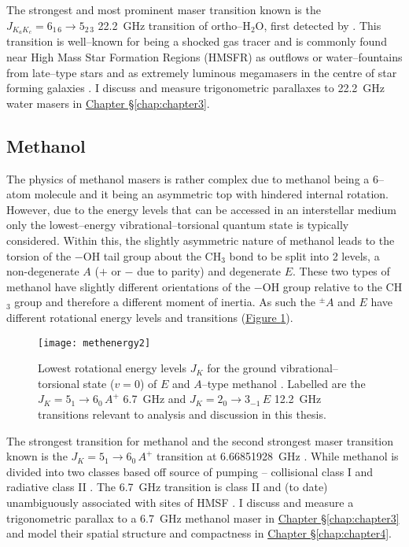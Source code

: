 			The strongest and most prominent maser transition known is the $J_{K_a K_c}=6_{1\,6}\rightarrow5_{2\,3}$ 22.2~GHz transition of ortho--H$_2$O, first detected by \citet{Cheung1969}. This transition is well--known for being a shocked gas tracer and is commonly found near High Mass Star Formation Regions (HMSFR) as outflows or water--fountains from late--type stars \citep[e.g. ][]{Orosz2019} and as extremely luminous megamasers in the centre of star forming galaxies \citep{DosSantosLepine1979}. I discuss and measure trigonometric parallaxes to 22.2~GHz water masers in \hyperref[chap:chapter3]{Chapter \S \ref*{chap:chapter3}}.
			
		\subsection{Methanol}
			The physics of methanol masers is rather complex due to methanol being a 6--atom molecule and it being an asymmetric top with hindered internal rotation. However, due to the energy levels that can be accessed in an interstellar medium only the lowest--energy vibrational--torsional quantum state is typically considered. Within this, the slightly asymmetric nature of methanol leads to the torsion of the $-$OH tail group about the CH$_3$ bond to be split into 2 levels, a non-degenerate $A$ ($+$ or $-$ due to parity) and degenerate $E$. These two types of methanol have slightly different orientations of the $-$OH group relative to the CH$_3$ group and therefore a different moment of inertia. As such the $^\pm A$ and $E$ have different rotational energy levels and transitions (\hyperref[fig:intro_methanollevels]{Figure \ref*{fig:intro_methanollevels}}).
			\begin{figure}
				\centering
				\texttt{[image: methenergy2]}
				\caption[Methanol energy levels]{Lowest rotational energy levels $J_K$ for the ground vibrational--torsional state ($v=0$) of $E$ and $A$--type methanol \citet{Jansen2011}. Labelled are the $J_K=5_1\rightarrow6_0\,A^+$ 6.7~GHz and $J_K=2_0\rightarrow3_{-1}\,E$ 12.2~GHz transitions relevant to analysis and discussion in this thesis.}
				\label{fig:intro_methanollevels}
			\end{figure}
			
			The strongest transition for methanol and the second strongest maser transition known is the $J_K=5_1\rightarrow6_0\,A^+$ transition at 6.66851928~GHz \citep{Menten1991}. While methanol is divided into two classes based off source of pumping -- collisional class I and radiative class II \citep[][]{Menten1991b}. The 6.7~GHz transition is class II and (to date) unambiguously associated with sites of HMSF \citep[][]{Ellingsen2006,Breen2013}. I discuss and measure a trigonometric parallax to a 6.7~GHz methanol maser in \hyperref[chap:chapter3]{Chapter \S \ref*{chap:chapter3}} and model their spatial structure and compactness in \hyperref[chap:chapter4]{Chapter \S \ref*{chap:chapter4}}.
			

